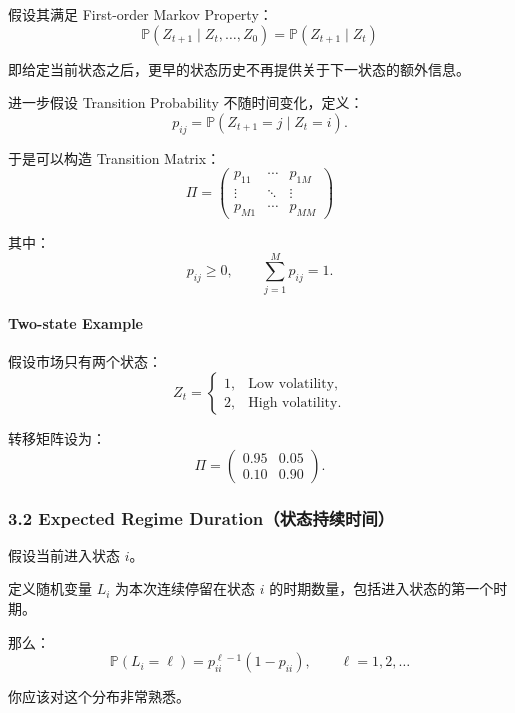 假设其满足 First-order Markov Property：
\[\boxed{
\mathbb P(Z_{t+1}\mid Z_t,\ldots,Z_0)
=
\mathbb P(Z_{t+1}\mid Z_t)
}\]

即给定当前状态之后，更早的状态历史不再提供关于下一状态的额外信息。

进一步假设 Transition Probability 不随时间变化，定义：
\[p_{ij}
=
\mathbb P(Z_{t+1}=j\mid Z_t=i).\]

于是可以构造 Transition Matrix：
\[\boxed{
\Pi=
\begin{pmatrix}
p_{11}&\cdots&p_{1M}\\
\vdots&\ddots&\vdots\\
p_{M1}&\cdots&p_{MM}
\end{pmatrix}
}\]

其中：
\[p_{ij}\geq0,
\qquad
\sum_{j=1}^{M}p_{ij}=1.\]

\hypertarget{part-4-77-0001-two-state-example}{%
\paragraph{Two-state Example}\label{part-4-77-0001-two-state-example}}

假设市场只有两个状态：
\[Z_t=
\begin{cases}
1,&\text{Low volatility},\\
2,&\text{High volatility}.
\end{cases}\]

转移矩阵设为：
\[\Pi=
\begin{pmatrix}
0.95&0.05\\
0.10&0.90
\end{pmatrix}.\]


\hypertarget{part-4-77-0001-expected-regime-durationux72b6ux6001ux6301ux7eedux65f6ux95f4}{%
\subsubsection{3.2 Expected Regime Duration（状态持续时间）}\label{part-4-77-0001-expected-regime-durationux72b6ux6001ux6301ux7eedux65f6ux95f4}}

假设当前进入状态 \(i\)。

定义随机变量 \(L_i\) 为本次连续停留在状态 \(i\) 的时期数量，包括进入状态的第一个时期。

那么：
\[\mathbb P(L_i=\ell)
=
p_{ii}^{\ell-1}(1-p_{ii}),
\qquad \ell=1,2,\ldots\]

你应该对这个分布非常熟悉。


